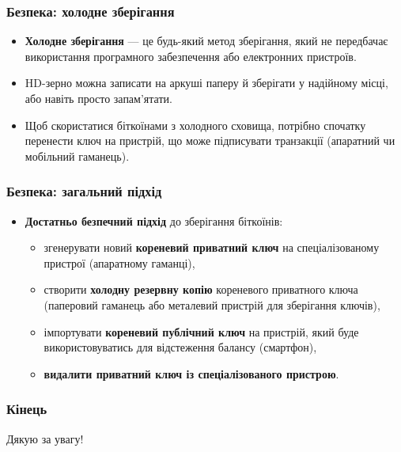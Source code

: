 \documentclass{beamer}
\begin{document}
\begin{frame}
  \frametitle{Безпека: холодне зберігання}
  \begin{itemize}
  \item \textbf{Холодне зберігання} — це будь-який метод зберігання, який не
    передбачає використання програмного забезпечення або електронних пристроїв.
  \item HD-зерно можна записати на аркуші паперу й зберігати у надійному місці,
    або навіть просто запам’ятати.
  \item Щоб скористатися біткоїнами з холодного сховища, потрібно спочатку
    перенести ключ на пристрій, що може підписувати транзакції (апаратний чи
    мобільний гаманець).
  \end{itemize}
\end{frame}

\begin{frame}
  \frametitle{Безпека: загальний підхід}
  \begin{itemize}
  \item \textbf{Достатньо безпечний підхід} до зберігання біткоїнів:
    \begin{itemize}
    \item згенерувати новий \textbf{кореневий приватний ключ} на
      спеціалізованому пристрої (апаратному гаманці),
    \item створити \textbf{холодну резервну копію} кореневого приватного ключа
      (паперовий гаманець або металевий пристрій для зберігання ключів),
    \item імпортувати \textbf{кореневий публічний ключ} на пристрій, який буде
      використовуватись для відстеження балансу (смартфон),
    \item \textbf{видалити приватний ключ із спеціалізованого пристрою}.
    \end{itemize}
  \end{itemize}
\end{frame}


\begin{frame}
  \frametitle{Кінець}
  \begin{center}
    Дякую за увагу!
  \end{center}
\end{frame}
\end{document}

